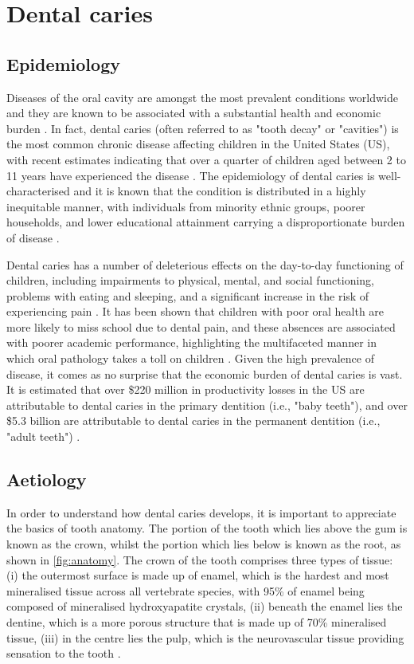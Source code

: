 \section{Dental caries}

\subsection{Epidemiology}

Diseases of the oral cavity are amongst the most prevalent conditions worldwide and they are known to be associated with a substantial health and economic burden \citep{peres2019, gbd2017}. In fact, dental caries (often referred to as "tooth decay" or "cavities") is the most common chronic disease affecting children in the United States (US), with recent estimates indicating that over a quarter of children aged between 2 to 11 years have experienced the disease \citep{oral2000, bashir2022}. The epidemiology of dental caries is well-characterised and it is known that the condition is distributed in a highly inequitable manner, with individuals from minority ethnic groups, poorer households, and lower educational attainment carrying a disproportionate burden of disease \citep{bashir2021, bashir2022}.

Dental caries has a number of deleterious effects on the day-to-day functioning of children, including impairments to physical, mental, and social functioning, problems with eating and sleeping, and a significant increase in the risk of experiencing pain  \citep{cunnion2010, singh2020, boeira2012}. It has been shown that children with poor oral health are more likely to miss school due to dental pain, and these absences are associated with poorer academic performance, highlighting the multifaceted manner in which oral pathology takes a toll on children \citep{jackson2011}. Given the high prevalence of disease, it comes as no surprise that the economic burden of dental caries is vast. It is estimated that over \$220 million in productivity losses in the US are attributable to dental caries in the primary dentition (i.e., "baby teeth"), and over \$5.3 billion are attributable to dental caries in the permanent dentition (i.e., "adult teeth") \citep{righolt2018}.

\subsection{Aetiology}

In order to understand how dental caries develops, it is important to appreciate the basics of tooth anatomy. The portion of the tooth which lies above the gum is known as the crown, whilst the portion which lies below is known as the root, as shown in \autoref{fig:anatomy}. The crown of the tooth comprises three types of tissue: (i) the outermost surface is made up of enamel, which is the hardest and most mineralised tissue across all vertebrate species, with 95\% of enamel being composed of mineralised hydroxyapatite crystals, (ii) beneath the enamel lies the dentine, which is a more porous structure that is made up of 70\% mineralised tissue, (iii) in the centre lies the pulp, which is the neurovascular tissue providing sensation to the tooth \citep{lacruz2017, goldberg2011}.

